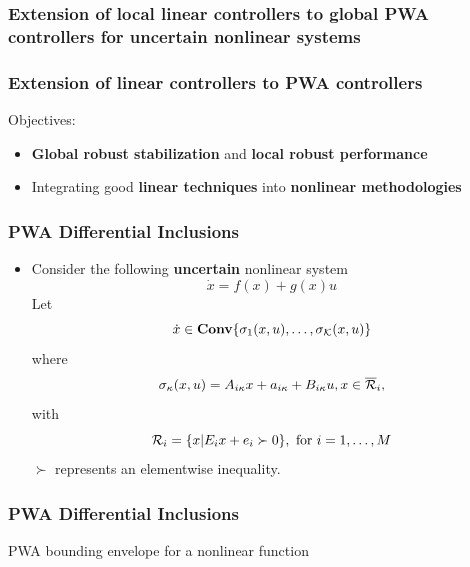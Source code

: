 \documentclass{beamer}
\newcommand{\RR}{{\cal R}}
\newcommand{\KA}{{\cal K}}
\newcommand{\beq}{\begin{equation*}}
\newcommand{\eeq}{\end{equation*}}
\newcommand{\CO}{\textbf{Conv}}
\begin{document}
  \frame
  {
    \frametitle{Extension of local linear controllers to global PWA controllers for uncertain nonlinear systems}

    \centerline{}
  }

  \frame
  {
    \frametitle{Extension of linear controllers to PWA controllers}
    Objectives:
    \begin{itemize}
\item \textbf{Global robust stabilization} and \textbf{local robust performance}
\item Integrating good \textbf{linear techniques} into \textbf{nonlinear methodologies}
\end{itemize}
  }

  \frame
  {
    \frametitle{PWA Differential Inclusions}
    \begin{itemize}
    \item Consider the following \textbf{uncertain} nonlinear system
\beq
\dot x=f(x)+g(x)u
\eeq
Let 
\beq
\dot x\in\CO\{\sigma_{1}(x,u),\ldots,\sigma_\KA(x,u)\}
\eeq
where
\beq
\sigma_\kappa(x,u)=A_{i\kappa}x+a_{i\kappa}+B_{i\kappa} u, x\in\overline\RR_i,
\eeq
with  
\beq
\RR_i = \{ x| E_ix+e_i \succ 0\}, \text{ for } i=1,\ldots,M
\eeq
$\succ$ represents an elementwise inequality.
\end{itemize}
  }

  \frame
  {
    \frametitle{PWA Differential Inclusions}
\centerline{PWA bounding envelope for a nonlinear function}  
\centerline{\resizebox{8cm}{!}{}}
}
\end{document}
